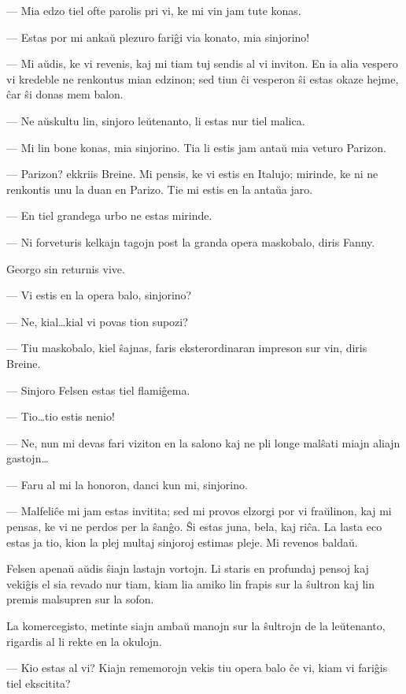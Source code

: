  --- Mia edzo tiel ofte parolis pri vi, ke mi vin jam tute konas.

 --- Estas por mi anka\u u plezuro fari\^gi via konato, mia sinjorino!

 --- Mi a\u udis, ke vi revenis, kaj mi tiam tuj sendis al vi inviton.
En ia alia vespero vi kredeble ne renkontus mian edzinon; sed tiun
\^ci vesperon \^si estas okaze hejme, \^car \^si donas mem balon.

 --- Ne a\u uskultu lin, sinjoro le\u utenanto, li estas nur tiel malica.

 --- Mi lin bone konas, mia sinjorino. Tia li estis jam anta\u u mia
veturo Parizon.

 --- Parizon? ekkriis Breine. Mi pensis, ke vi estis en Italujo;
mirinde, ke ni ne renkontis unu la duan en Parizo. Tie mi estis en
la anta\u ua jaro.

 --- En tiel grandega urbo ne estas mirinde.

 --- Ni forveturis kelkajn tagojn post la granda opera maskobalo, diris
Fanny.

   Georgo sin returnis vive.

 --- Vi estis en la opera balo, sinjorino?

 --- Ne, kial\dots kial vi povas tion supozi?

 --- Tiu maskobalo, kiel \^sajnas, faris eksterordinaran impreson sur
vin, diris Breine.

 --- Sinjoro Felsen estas tiel flami\^gema.

 --- Tio\dots tio estis nenio!

 --- Ne, nun mi devas fari viziton en la salono kaj ne pli longe
mal\^sati miajn aliajn gastojn\dots

 --- Faru al mi la honoron, danci kun mi, sinjorino.

 --- Malfeli\^ce mi jam estas invitita; sed mi provos elzorgi por vi
fra\u ulinon, kaj mi pensas, ke vi ne perdos per la \^san\^go. \^Si
estas juna, bela, kaj ri\^ca. La lasta eco estas ja tio, kion la
plej multaj sinjoroj estimas pleje. Mi revenos balda\u u.

   Felsen apena\u u a\u udis \^siajn lastajn vortojn. Li staris en profundaj
pensoj kaj veki\^gis el sia revado nur tiam, kiam lia amiko lin
frapis sur la \^sultron kaj lin premis malsupren sur la sofon.

   La komercegisto, metinte siajn amba\u u manojn sur la \^sultrojn de la
le\u u\-te\-nan\-to, rigardis al li rekte en la okulojn.

 --- Kio estas al vi? Kiajn rememorojn vekis tiu opera balo \^ce vi,
kiam vi fari\^gis tiel ekscitita?

